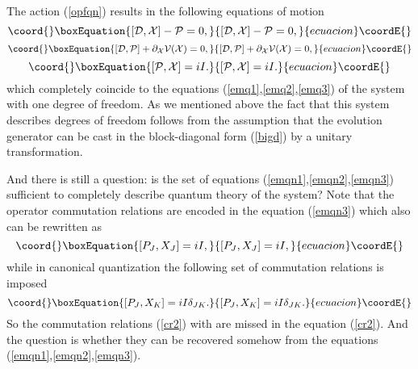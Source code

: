\documentclass[a4paper,11pt]{article}
\begin{document}
 The action
(\ref{opfqn}) results in the following equations of motion
\begin{equation}\coord{}\boxEquation{
[{\cal D},{\cal X}]-{\cal P}=0, \label{emqn1}
}{
[{\cal D},{\cal X}]-{\cal P}=0, }{ecuacion}\coordE{}\end{equation}
\begin{equation}\coord{}\boxEquation{
[{\cal D},{\cal P}] + \partial_{\cal X} {\cal V}({\cal X})=0,
\label{emqn2}
}{
[{\cal D},{\cal P}] + \partial_{\cal X} {\cal V}({\cal X})=0,
}{ecuacion}\coordE{}\end{equation}
\begin{equation}\coord{}\boxEquation{
[{\cal P},{\cal X}]=iI. \label{emqn3}
}{
[{\cal P},{\cal X}]=iI. }{ecuacion}\coordE{}\end{equation}
which completely coincide to the equations
(\ref{emq1},\ref{emq2},\ref{emq3}) of the system with one degree
of freedom. As we mentioned above the fact that this system
describes \coordHE{} degrees of freedom follows from the assumption that
the evolution generator \coordHE{} can be cast in the
block-diagonal form (\ref{bigd}) by a unitary transformation.


And there is still a question: is the set of equations
(\ref{emqn1},\ref{emqn2},\ref{emqn3}) sufficient to completely
describe quantum theory of the system? Note that the operator
commutation relations are encoded in the equation (\ref{emqn3})
which also can be rewritten as
\begin{equation}\coord{}\boxEquation{
[P_J,X_J]=iI, \label{cr1}
}{
[P_J,X_J]=iI, }{ecuacion}\coordE{}\end{equation}
while in canonical quantization the following set of commutation
relations is imposed
\begin{equation}\coord{}\boxEquation{
[P_J,X_K]=iI\delta_{JK}. \label{cr2}
}{
[P_J,X_K]=iI\delta_{JK}. }{ecuacion}\coordE{}\end{equation}
So the commutation relations (\ref{cr2}) with \coordHE{} are missed
in the equation (\ref{cr2}). And the question is whether they can
be recovered somehow from the equations
(\ref{emqn1},\ref{emqn2},\ref{emqn3}).
\end{document}
